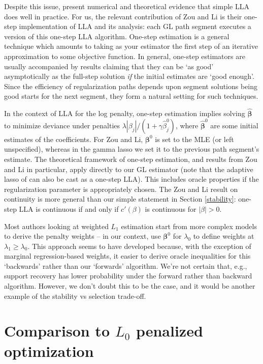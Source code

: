\documentclass[12pt]{article}
\newcommand{\bs}[1]{\boldsymbol{#1}}
\begin{document}
Despite this issue, \citet{zou_one-step_2008} present numerical and
theoretical evidence that simple LLA does well in practice. For us, the
relevant contribution of Zou and Li is their one-step implementation of LLA
and its analysis: each GL path segment executes a version of this one-step LLA
algorithm. One-step estimation is a general technique
\citep[e.g.,][]{bickel_one-step_1975} which amounts to taking as your estimator
the first step of an iterative approximation to some objective function.   In
general, one-step estimators are usually accompanied by results claiming that
they can be `as good' asymptotically as the full-step solution {\it if} the
initial estimates are `good enough'.  Since the efficiency of regularization
paths depends upon segment solutions being good starts for the next segment,
they form a natural setting for such techniques.

In the context of LLA for the log penalty, one-step estimation implies solving
$\bs{\hat\beta}$ to minimize deviance under  penalties $\lambda|\beta_j|/(1 +
\gamma \hat\beta_j^0)$, where $\bs{\hat\beta}^0$ are some initial estimates of
the coefficients.  For Zou and Li, $\bs{\beta}^0$ is set to the
MLE (or left unspecified), whereas in  the gamma lasso we set it to the
previous path segment's estimate. The theoretical framework of one-step
estimation, and results from  Zou and Li in particular, apply
directly to our GL estimator (note that the adaptive lasso of
\citet{zou_adaptive_2006} can also be cast as a one-step LLA). This includes
oracle properties if the regularization parameter is appropriately chosen. The
Zou and Li result on continuity is  more general than our
simple statement in Section \ref{stability}:  one-step LLA is continuous if
and only if $c'(\beta)$ is continuous for $|\beta|>0$.  


Most authors looking at weighted $L_1$ estimation start from more complex models to derive the penalty weights -- in our context, use $\bs{\beta}^0$ for $\lambda_0$ to define weights at $\lambda_1 \geq \lambda_0$.  This approach seems to have developed because, with the exception of marginal regression-based weights, it easier to derive oracle inequalities for this `backwards' rather than our `forwards' algorithm.  
We're not certain that, e.g., support recovery has lower probability under the forward rather than backward algorithm.  However, we don't doubt this to be the case, and it would be another example of the stability vs selection trade-off.


\section{Comparison to $L_0$ penalized optimization}
\end{document}
